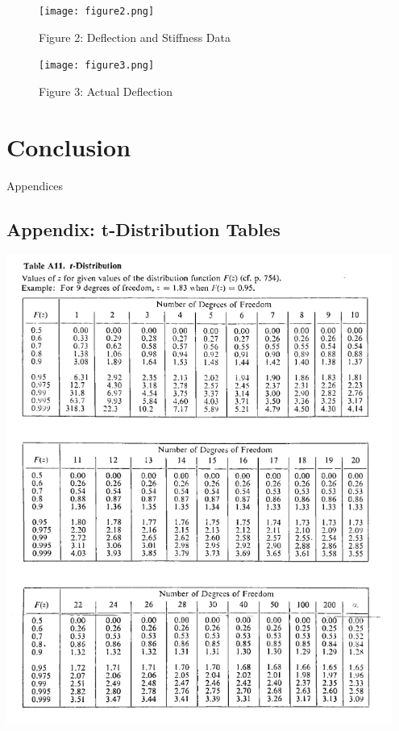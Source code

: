 \documentclass{article}
\begin{document}
\begin{figure}[hbtp]
  \centering
  \texttt{[image: figure2.png]}
  \caption{Figure 2: Deflection and Stiffness Data}
  \label{fig:deflect_stiff}
\end{figure}

\begin{figure}[hbtp]
  \centering
  \texttt{[image: figure3.png]}
  \caption{Figure 3: Actual Deflection}
  \label{fig:actual_deflection}
\end{figure}


\section{Conclusion}

\newpage
\thispagestyle{empty}  %
\begin{center}
	\vspace*{\fill}
	{\Huge Appendices}
	\vspace*{\fill}
\end{center}

\newpage
\begin{appendices}
\pagestyle{fancy}
\renewcommand{\thefigure}{A\arabic{figure}}
\setcounter{figure}{0}

\section*{Appendix: t-Distribution Tables}
\hypertarget{1}{\includegraphics[width=0.95\textwidth]{t_distribution_Table_lecture3.png}}
\end{appendices}
\end{document}
